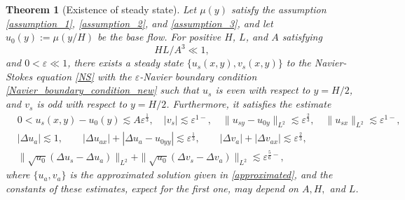 \documentclass[reqno, 11pt]{amsart}
\theoremstyle{plain}
\newtheorem{theorem}{Theorem}[section]
\theoremstyle{definition}
\theoremstyle{remark}
\numberwithin{equation}{section}
\begin{document}
\begin{theorem}[Existence of steady state]\label{Thm_H_Existence}
Let $\mu(y)$ satisfy the assumption \eqref{assumption_1}, \eqref{assumption_2}, and \eqref{assumption_3}, and let $u_0(y) := \mu(y/H)$ be the base flow. For positive $H$, $L$, and $A$ satisfying
\begin{equation}\label{H_assumption}
 HL/A^3 \ll 1,
\end{equation}
 and $0 < \varepsilon \ll 1$, there exists a steady state $\{ u_s(x,y), v_s(x,y) \}$ to the Navier-Stokes equation \eqref{NS} with the $\varepsilon$-Navier boundary condition \eqref{Navier_boundary_condition_new} such that $u_s$ is even with respect to $y = H/2$, and $v_s$ is odd with respect to $y = H/2$. Furthermore, it satisfies the estimate
\begin{equation}\label{ss_estimates_H}
\begin{aligned}
&0 < u_s(x,y) - u_0(y) \lesssim A \varepsilon^{\frac{1}{3}}, \quad |v_{s}|  \lesssim \varepsilon^{1-}, \quad \|u_{sy} - u_{0y}\|_{L^2} \lesssim \varepsilon^{\frac{2}{3}}, \quad
\|u_{sx}\|_{L^2}  \lesssim \varepsilon^{1-},\\
& |\Delta u_a| \lesssim 1, \qquad | \Delta u_{ax}| + |\Delta u_a - u_{0yy}| \lesssim \varepsilon^{\frac{1}{3}},  \qquad |\Delta v_a| + |\Delta v_{ax}| \lesssim \varepsilon^{\frac{2}{3}},\\
& \| \sqrt{u_0} (\Delta u_s - \Delta u_a) \|_{L^2} + \| \sqrt{u_0} (\Delta v_s - \Delta v_a) \|_{L^2}    \lesssim \varepsilon^{\frac{5}{6}-},
\end{aligned}
\end{equation}
where $\{u_a, v_a\}$ is the approximated solution given in \eqref{approximated}, and the constants of these estimates, expect for the first one, may depend on $A, H,$ and $L$.
\end{theorem}
\end{document}

